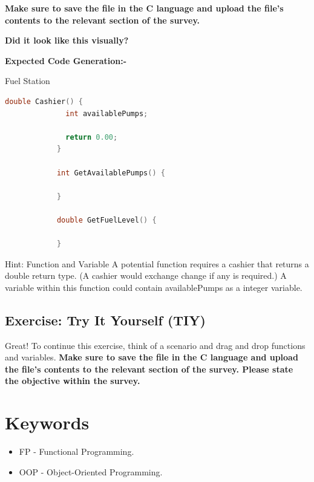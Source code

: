 \documentclass[10pt]{article}
\begin{document}
        \textbf{Make sure to save the file in the C language and upload the file's contents to the relevant section of the survey.}

        \textbf{Did it look like this visually?}

        \textbf{Expected Code Generation:-}
        \begin{example}{Fuel Station}
          \begin{lstlisting}[language=c]
            double Cashier() {
              int availablePumps;

              return 0.00;
            }

            int GetAvailablePumps() {

            }

            double GetFuelLevel() {

            }
          \end{lstlisting}
        \end{example}

        \begin{tip}{Hint: Function and Variable}
          A potential function requires a cashier that returns a double return type. (A cashier would exchange change if any is required.) A variable within this function could contain availablePumps as a integer variable.
        \end{tip}
    \subsection{Exercise: Try It Yourself (TIY)}
        Great! To continue this exercise, think of a scenario and drag and drop functions and variables.
        \textbf{Make sure to save the file in the C language and upload the file's contents to the relevant section of the survey. Please state the objective within the survey.}
\section{Keywords}
\label{sec:keywords}
    \begin{itemize}
      \item FP - Functional Programming.
      \item OOP - Object-Oriented Programming.
    \end{itemize}

\clearpage
\nocite{*}
\small{
}
\end{document}

